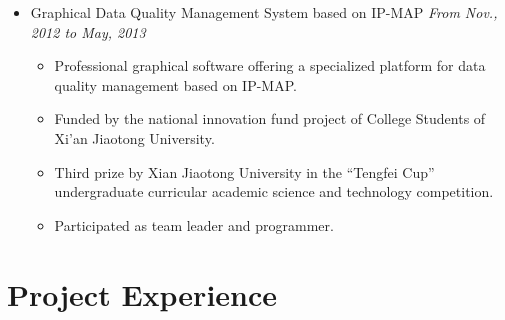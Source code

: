 \documentclass[letterpaper,11pt]{article}
\newenvironment{extra}{}{}
\begin{document}
\begin{itemize}
\begin{extra}
    \item Graphical Data Quality Management System based on IP-MAP \hfill \textit{From Nov., 2012 to May,
2013}
    \begin{itemize}
        \item Professional graphical software offering a specialized platform for data quality management based on IP-MAP.
        \item Funded by the national innovation fund project of College Students of Xi’an Jiaotong University.
        \item Third prize by Xian Jiaotong University in the “Tengfei Cup” undergraduate
curricular academic science and technology competition.
        \item Participated as team leader and programmer.
    \end{itemize}
\end{extra}

\end{itemize}


\section{Project Experience}
\end{document}
